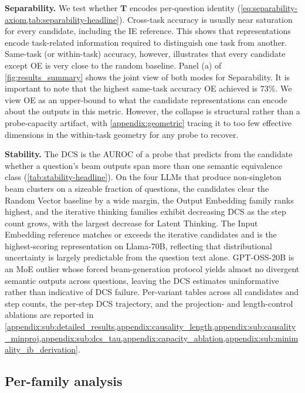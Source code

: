 
\textbf{Separability.} We test whether $\mathbf{T}$ encodes per-question identity (\cref{eq:separability-axiom,tab:separability-headline}). Cross-task accuracy is usually near saturation for every candidate, including the IE reference. This shows that representations encode task-related information required to distinguish one task from another. Same-task (or within-task) accuracy, however, illustrates that every candidate except OE is very close to the random baseline. Panel (a) of \cref{fig:results_summary} shows the joint view of both modes for Separability. It is important to note that the highest same-task accuracy OE achieved is $73\%$. We view OE as an upper-bound to what the candidate representations can encode about the outputs in this metric. However, the collapse is structural rather than a probe-capacity artifact, with \cref{appendix:geometric} tracing it to too few effective dimensions in the within-task geometry for any probe to recover.




\textbf{Stability.} The DCS is the AUROC of a probe that predicts from the candidate whether a question's beam outputs span more than one semantic equivalence class (\cref{tab:stability-headline}). On the four LLMs that produce non-singleton beam clusters on a sizeable fraction of questions, the candidates clear the Random Vector baseline by a wide margin, the Output Embedding family ranks highest, and the iterative thinking families exhibit decreasing DCS as the step count grows, with the largest decrease for Latent Thinking. The Input Embedding reference matches or exceeds the iterative candidates and is the highest-scoring representation on Llama-70B, reflecting that distributional uncertainty is largely predictable from the question text alone. GPT-OSS-20B is an MoE outlier whose forced beam-generation protocol yields almost no divergent semantic outputs across questions, leaving the DCS estimates uninformative rather than indicative of DCS failure. Per-variant tables across all candidates and step counts, the per-step DCS trajectory, and the projection- and length-control ablations are reported in \cref{appendix:sub:detailed_results,appendix:causality_length,appendix:sub:causality_minproj,appendix:sub:dcs_tau,appendix:capacity_ablation,appendix:sub:minimality_ib_derivation}.

\subsection{Per-family analysis}
\label{sec:results:per-family}

